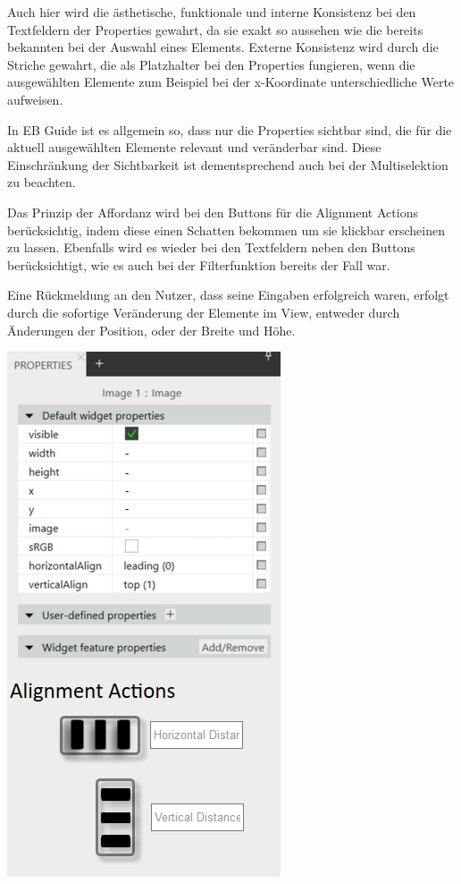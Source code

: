 Auch hier wird die ästhetische, funktionale und interne Konsistenz bei den Textfeldern der Properties gewahrt, da sie exakt so aussehen wie die bereits bekannten bei der Auswahl eines Elements.
Externe Konsistenz wird durch die Striche gewahrt, die als Platzhalter bei den Properties fungieren, wenn die ausgewählten Elemente zum Beispiel bei der x-Koordinate unterschiedliche Werte aufweisen.

In EB Guide ist es allgemein so, dass nur die Properties sichtbar sind, die für die aktuell ausgewählten Elemente relevant und veränderbar sind.
Diese Einschränkung der Sichtbarkeit ist dementsprechend auch bei der Multiselektion zu beachten.

Das Prinzip der Affordanz wird bei den Buttons für die Alignment Actions berücksichtig, indem diese einen Schatten bekommen um sie klickbar erscheinen zu lassen.
Ebenfalls wird es wieder bei den Textfeldern neben den Buttons berücksichtigt, wie es auch bei der Filterfunktion bereits der Fall war.

Eine Rückmeldung an den Nutzer, dass seine Eingaben erfolgreich waren, erfolgt durch die sofortige Veränderung der Elemente im View, entweder durch Änderungen der Position, oder der Breite und Höhe.

\begin{center}
  \includegraphics[scale=0.8]{figures/Mehrfachselektion_Adaption02.png}
  \label{fig:Mehrfachselektion_Adaption}
\end{center}

